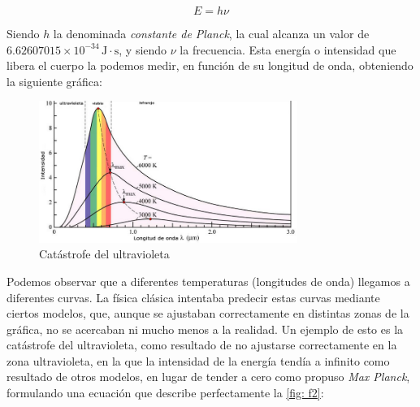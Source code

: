 \documentclass{article}
\begin{document}
    \vspace{5mm}

    \begin{equation}
        E = h \nu
        \label{eq: planck}
    \end{equation}

    \vspace{5mm}

    Siendo \( h \) la denominada \textit{constante de Planck}, la cual alcanza un valor de \( 6.62607015 \times 10^{-34} \, \text{J} \cdot \text{s} \), y siendo \( \nu \) la frecuencia. Esta energía o intensidad que libera el cuerpo la podemos medir, en función de su longitud de onda, obteniendo la siguiente gráfica:

    \vspace{5mm}

    \begin{figure}[h]
        \centering
        \includegraphics[width=0.75\textwidth]{img/Introduccion/catastrofe_ultravioleta.png}
        \caption{Catástrofe del ultravioleta}
        \label{fig: f2}
    \end{figure}

    \vspace{5mm}

    Podemos observar que a diferentes temperaturas (longitudes de onda) llegamos a diferentes curvas. La física clásica intentaba predecir estas curvas mediante ciertos modelos, que, aunque se ajustaban correctamente en distintas zonas de la gráfica, no se acercaban ni mucho menos a la realidad. Un ejemplo de esto es la catástrofe del ultravioleta, como resultado de no ajustarse correctamente en la zona ultravioleta, en la que la intensidad de la energía tendía a infinito como resultado de otros modelos, en lugar de tender a cero como propuso \textit{Max Planck}, formulando una ecuación que describe perfectamente la \autoref{fig: f2}:

    \vspace{5mm}
\end{document}
